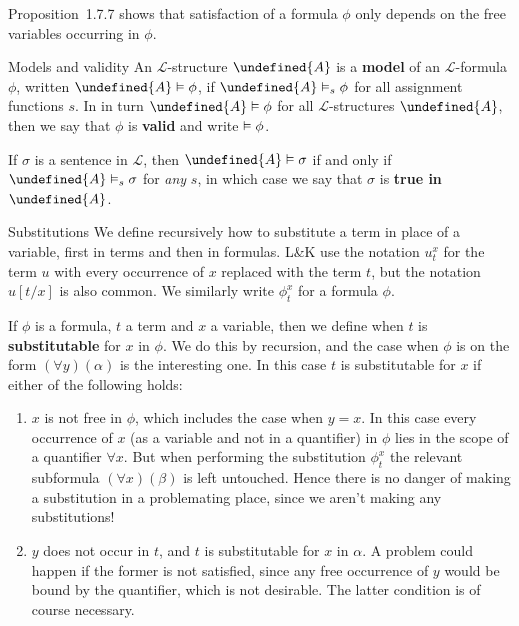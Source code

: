 \documentclass[article, a4paper, 11pt, oneside]{memoir}
\let\mathfrak\undefined
\numberwithin{equation}{chapter}
\newcommand{\calL}{\mathcal{L}}
\newcommand{\frakA}{\mathfrak{A}}
\newcommand{\keyword}[1]{{\bfseries #1}}
\theoremstyle{nonumberplain}
\begin{document}
\begin{notelist}
    Proposition~1.7.7 shows that satisfaction of a formula $\phi$ only depends on the free variables occurring in $\phi$.

    \item[Models and validity]
    An $\calL$-structure $\frakA$ is a \keyword{model} of an $\calL$-formula $\phi$, written $\frakA \models \phi$, if $\frakA \sats{s} \phi$ for all assignment functions $s$. In in turn $\frakA \models \phi$ for all $\calL$-structures $\frakA$, then we say that $\phi$ is \keyword{valid} and write $\vDash \phi$.

    If $\sigma$ is a sentence in $\calL$, then $\frakA \models \sigma$ if and only if $\frakA \sats{s} \sigma$ for \emph{any} $s$, in which case we say that $\sigma$ is \keyword{true in $\frakA$}.

    \item[Substitutions]
    We define recursively how to substitute a term in place of a variable, first in terms and then in formulas. L\&K use the notation $u^x_t$ for the term $u$ with every occurrence of $x$ replaced with the term $t$, but the notation $u[t/x]$ is also common. We similarly write $\phi^x_t$ for a formula $\phi$. %

    If $\phi$ is a formula, $t$ a term and $x$ a variable, then we define when $t$ is \keyword{substitutable} for $x$ in $\phi$. We do this by recursion, and the case when $\phi$ is on the form $(\forall y)(\alpha)$ is the interesting one. In this case $t$ is substitutable for $x$ if either of the following holds:
    \begin{enumerate}
        \item $x$ is not free in $\phi$, which includes the case when $y = x$. In this case every occurrence of $x$ (as a variable and not in a quantifier) in $\phi$ lies in the scope of a quantifier $\forall x$. But when performing the substitution $\phi^x_t$ the relevant subformula $(\forall x)(\beta)$ is left untouched. Hence there is no danger of making a substitution in a problemating place, since we aren't making any substitutions!

        \item $y$ does not occur in $t$, and $t$ is substitutable for $x$ in $\alpha$. A problem could happen if the former is not satisfied, since any free occurrence of $y$ would be bound by the quantifier, which is not desirable. The latter condition is of course necessary.
    \end{enumerate}


\end{notelist}
\end{document}
